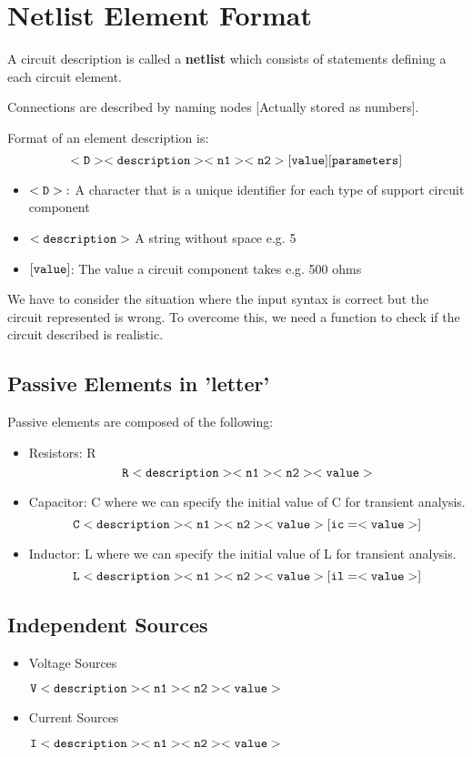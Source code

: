 \documentclass[a4paper, titlepage]{article}
\begin{document}
    \section{Netlist Element Format}
    A circuit description is called a \textbf{netlist} which consists of statements defining a each circuit element.
    \par
    Connections are described by naming nodes [Actually stored as numbers].
    \par
    Format of an element description is:
        $$\tt{<D><description> <n1> <n2> [value] [parameters]}$$
        \begin{itemize}
            \item $\tt{<D>}:$ A character that is a unique identifier for each type of support circuit component
            \item $\tt{<description>}$ A string without space e.g. 5
            \item $\tt{[value]}$: The value a circuit component takes e.g. 500 ohms
        \end{itemize}
    \par
    We have to consider the situation where the input syntax is correct but the circuit represented is wrong.
    To overcome this, we need a function to check if the circuit described is realistic. 

    \subsection{Passive Elements in {\selectfont 'letter'}}
    Passive elements are composed of the following:
    \begin{itemize}
        \item Resistors: {\selectfont R} $$ \tt R<description> <n1> <n2> <value> $$
        \item Capacitor: {\selectfont C} where we can specify the initial value of C for transient analysis.$$ \tt C<description> <n1> <n2> <value> [ic=<value>] $$
        \item Inductor: {\selectfont L} where we can specify the initial value of L for transient analysis.$$ \tt L<description> <n1> <n2> <value> [il=<value>] $$
    \end{itemize}

    \subsection{Independent Sources}
    \begin{itemize}
        \item Voltage Sources 
        \begin{center}
            $\tt V<description> <n1> <n2><value>$
        \end{center}
        \item Current Sources
        \begin{center}
            $\tt I<description> <n1> <n2><value>$
        \end{center}
    \end{itemize}
\end{document}
